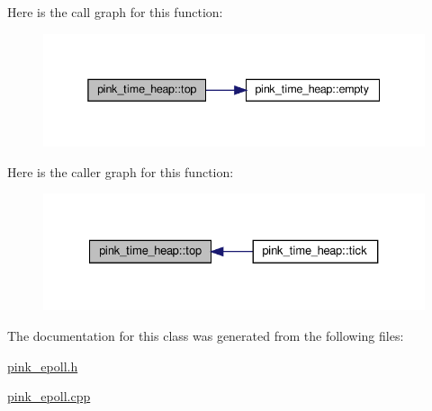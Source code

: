Here is the call graph for this function\+:
\nopagebreak
\begin{figure}[H]
\begin{center}
\leavevmode
\includegraphics[width=338pt]{classpink__time__heap_ac0932b13390241373290a321ecf16600_cgraph}
\end{center}
\end{figure}
Here is the caller graph for this function\+:
\nopagebreak
\begin{figure}[H]
\begin{center}
\leavevmode
\includegraphics[width=327pt]{classpink__time__heap_ac0932b13390241373290a321ecf16600_icgraph}
\end{center}
\end{figure}


The documentation for this class was generated from the following files\+:\begin{DoxyCompactItemize}
\item 
\hyperlink{pink__epoll_8h}{pink\+\_\+epoll.\+h}\item 
\hyperlink{pink__epoll_8cpp}{pink\+\_\+epoll.\+cpp}\end{DoxyCompactItemize}
